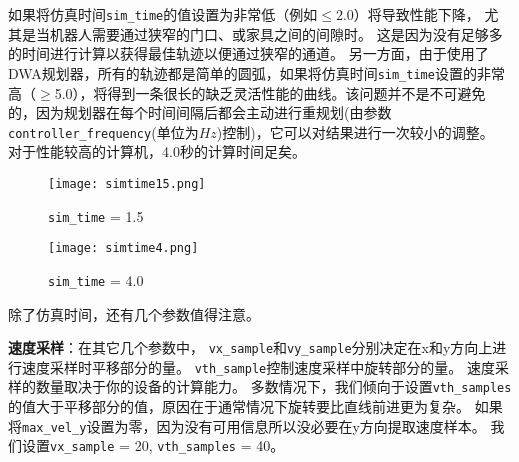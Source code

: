 如果将仿真时间\texttt{sim\_time}的值设置为非常低（例如$\leq 2.0$）将导致性能下降，
尤其是当机器人需要通过狭窄的门口、或家具之间的间隙时。
这是因为没有足够多的时间进行计算以获得最佳轨迹以便通过狭窄的通道。
另一方面，由于使用了DWA规划器，所有的轨迹都是简单的圆弧，如果将仿真时间\texttt{sim\_time}设置的非常高（$\geq$5.0），将得到一条很长的缺乏灵活性能的曲线。该问题并不是不可避免的，因为规划器在每个时间间隔后都会主动进行重规划(由参数\texttt{controller\_frequency}(单位为$Hz$)控制)，它可以对结果进行一次较小的调整。
对于性能较高的计算机，4.0秒的计算时间足矣。


\begin{figure}[!htb]
	\texttt{[image: simtime15.png]}
	\caption{\texttt{sim\_time} = 1.5}
	\endminipage\hfill
	\texttt{[image: simtime4.png]}
	\caption{\texttt{sim\_time} = 4.0}
	\endminipage\hfill
\end{figure}

除了仿真时间，还有几个参数值得注意。


\textbf{速度采样}：在其它几个参数中，
\texttt{vx\_sample}和\texttt{vy\_sample}分别决定在x和y方向上进行速度采样时平移部分的量。
\texttt{vth\_sample}控制速度采样中旋转部分的量。
速度采样的数量取决于你的设备的计算能力。
多数情况下，我们倾向于设置\texttt{vth\_samples}的值大于平移部分的值，原因在于通常情况下旋转要比直线前进更为复杂。
如果将\texttt{max\_vel\_y}设置为零，因为没有可用信息所以没必要在y方向提取速度样本。
我们设置\texttt{vx\_sample} = 20, \texttt{vth\_samples} = 40。


